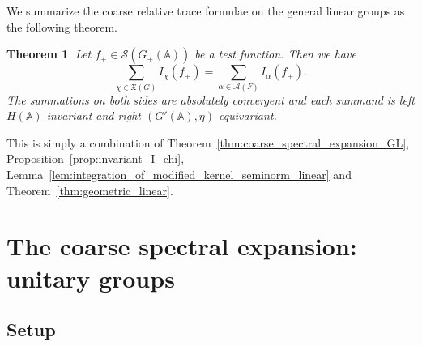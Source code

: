 \documentclass[letterpaper,11pt]{amsart}
\newcommand{\fX}{\mathfrak{X}}
\newcommand{\bA}{\mathbb{A}}
\newcommand{\cA}{\mathcal{A}}
\newcommand{\cS}{\mathcal{S}}
\newcommand{\<}{\negthickspace}
\theoremstyle{definition}
\theoremstyle{plain}
\newtheorem{theorem}[definition]{Theorem}
\theoremstyle{remark}
\numberwithin{equation}{section}
\begin{document}
We summarize the coarse relative trace formulae on the general linear groups
as the following theorem.

\begin{theorem} \label{thm:coarse_GL}
Let $f_+ \in \cS(G_+(\bA))$ be a test function. Then we have
    \[
    \sum_{\chi \in \fX(G)} I_{\chi}(f_+) =
    \sum_{\alpha \in \cA(F)} I_{\alpha}(f_+).
    \]
The summations on both sides are absolutely convergent and each summand is left $H(\bA)$-invariant and right
$(G'(\bA),\eta)$-equivariant.
\end{theorem}

This is simply a combination of
Theorem~\ref{thm:coarse_spectral_expansion_GL},
Proposition~\ref{prop:invariant_I_chi},
Lemma~\ref{lem:integration_of_modified_kernel_seminorm_linear} and
Theorem~\ref{thm:geometric_linear}.

\section{The coarse spectral expansion: unitary groups}
\label{sec:u_spectral}

\subsection{Setup}
\label{subsec:spec_unitary_setup}
\end{document}

